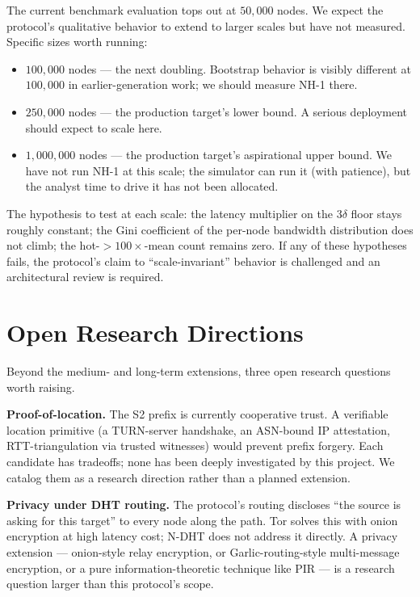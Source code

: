 \documentclass[twoside,nobib]{tufte-book}
\newcommand{\NDHT}{N-DHT\xspace}
\begin{document}
The current benchmark evaluation tops out at $50{,}000$ nodes.
We expect the protocol's qualitative behavior to extend to
larger scales but have not measured. Specific sizes worth
running:

\begin{itemize}\setlength\itemsep{0.1em}
  \item $100{,}000$ nodes --- the next doubling.
    Bootstrap behavior is visibly different at $100{,}000$
    in earlier-generation work; we should measure NH-1 there.
  \item $250{,}000$ nodes --- the production target's lower
    bound. A serious deployment should expect to scale here.
  \item $1{,}000{,}000$ nodes --- the production target's
    aspirational upper bound. We have not run NH-1 at this scale;
    the simulator can run it (with patience), but the analyst time
    to drive it has not been allocated.
\end{itemize}

The hypothesis to test at each scale: the latency multiplier on
the $3\delta$ floor stays roughly constant; the Gini coefficient
of the per-node bandwidth distribution does not climb; the
hot-$>100\times$-mean count remains zero. If any of these
hypotheses fails, the protocol's claim to ``scale-invariant''
behavior is challenged and an architectural review is required.

\section{Open Research Directions}

Beyond the medium- and long-term extensions, three open
research questions worth raising.

\textbf{Proof-of-location.} The S2 prefix is currently
cooperative trust. A verifiable location primitive (a TURN-server
handshake, an ASN-bound IP attestation, RTT-triangulation
via trusted witnesses) would prevent prefix forgery. Each
candidate has tradeoffs; none has been deeply investigated by
this project. We catalog them as a research direction rather
than a planned extension.

\textbf{Privacy under DHT routing.} The protocol's routing
discloses ``the source is asking for this target'' to every
node along the path. Tor solves this with onion encryption at
high latency cost; \NDHT does not address it directly. A privacy
extension --- onion-style relay encryption, or
Garlic-routing-style multi-message encryption, or a pure
information-theoretic technique like PIR --- is a research
question larger than this protocol's scope.
\end{document}
